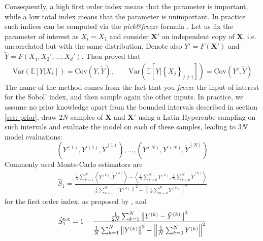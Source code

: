 \documentclass[draft]{agujournal2019}
\newcommand{\an}[1]{\ensuremath{\left\langle#1\right\rangle}} %
\newcommand{\sbra}[1]{\ensuremath{\left[#1\right]}} %
\newcommand{\pbra}[1]{\ensuremath{\left\{#1\right\}}} %
\newcommand{\parenthese}[1]{\ensuremath{\left(#1\right)}} %
\newcommand{\norm}[1]{\left\lVert #1 \right\rVert} %
\newcommand{\blu}[1]{{\color{BlueGreen} #1}}
\begin{document}
%
Consequently, a high first order index means that the parameter is important, while a low total index means that the parameter is unimportant.
%
In practice such indices can be computed via the \textit{pick\&freeze} formula \cite{sobol_sensitivity_1993}. Let us fix the parameter of interest as $X_i = X_1$ and consider $\bm X'$ an independent copy of $\bm X$, i.e. uncorrelated but with the same distribution. Denote also $Y' = F(\bm X')$ and $\tilde{Y} = F(X_1, X_2', \ldots, X_d')$. Then  proved that 
%
\begin{eqnarray*}
    \textrm{Var} \parenthese{\mathbb{E} \sbra{Y | X_1 }} = \textrm{Cov}( Y, \tilde{Y}), \qquad  \textrm{Var} \parenthese{\mathbb{E} \sbra{Y | \pbra{ X_j}_{j \neq i} }} = \textrm{Cov}(Y',\tilde{Y})
\end{eqnarray*}
%
The name of the method comes from the fact that you \textit{freeze} the input of interest for the Sobol' index, and then sample again the other inputs. In practice, we assume no prior knowledge apart from the bounded intervals described in section \ref{sec: prior}, draw $2N$ samples of $\bm X$ and $\bm X'$ using a Latin Hypercube sampling \cite{mckay_comparison_2000} on such intervals and evaluate the model on each of these samples, leading to $3N$ model evaluations:
\[
 \parenthese{Y^{(1)}, Y^{'(1)}, \tilde{Y}^{(1)}}, \ldots , \parenthese{Y^{(N)}, Y^{'(N)}, \tilde{Y}^{(N)}}
\] 
%
Commonly used Monte-Carlo estimators are   
%
\begin{eqnarray*}
    \hat{S}_1 = \frac{\frac{1}{N} \sum_{k=1}^N \an{Y^{(k)} , \tilde{Y}^{(k)}} - \an{\frac{1}{N} \sum_{k=0}^N Y^{(k)} , \frac{1}{N} \sum_{k=0}^N \tilde{Y}^{(k)}}}
    { \frac{1}{N} \sum_{k=1}^N \norm{ Y^{(k)}}^2 - \norm{ \frac{1}{N} \sum_{k=0}^N Y^{(k)} }^2 }
\end{eqnarray*}
%
for the first order index, as proposed by , and
%
\begin{eqnarray*}
    \hat{S}_1^{\rm tot} = 1- \frac{\frac{1}{2N} \sum_{k=1}^N \norm{ Y^{(k)} - \tilde{Y}^{(k)} }^2 }{ \frac{1}{N} \sum_{k=1}^N \norm{ Y^{(k)}}^2 - \norm{ \frac{1}{N} \sum_{k=0}^N Y^{(k)} }^2 }
\end{eqnarray*}
\end{document}

